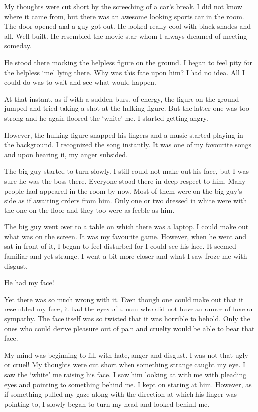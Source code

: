 \documentclass[twoside,11pt,titlepage]{article}
\begin{document}
My thoughts were cut short by the screeching of a car's break. I did not know where it came from, but there was an awesome looking sports car in the room. The door opened and a guy got out. He looked really cool with black shades and all. Well built. He resembled the movie star whom I always dreamed of meeting someday.

He stood there mocking the helpless figure on the ground. I began to feel pity for the helpless `me' lying there. Why was this fate upon him? I had no idea. All I could do was to wait and see what would happen.

At that instant, as if with a sudden burst of energy, the figure on the ground jumped and tried taking a shot at the hulking figure. But the latter one was too strong and he again floored the `white' me. I started getting angry.

However, the hulking figure snapped his fingers and a music started playing in the background. I recognized the song instantly. It was one of my favourite songs and upon hearing it, my anger subsided.

The big guy started to turn slowly. I still could not make out his face, but I was sure he was the boss there. Everyone stood there in deep respect to him. Many people had appeared in the room by now. Most of them were on the big guy's side as if awaiting orders from him. Only one or two dressed in white were with the one on the floor and they too were as feeble as him.

The big guy went over to a table on which there was a laptop. I could make out what was on the screen. It was my favourite game. However, when he went and sat in front of it, I began to feel disturbed for I could see his face. It seemed familiar and yet strange. I went a bit more closer and what I saw froze me with disgust.

He had my face!

Yet there was so much wrong with it. Even though one could make out that it resembled my face, it had the eyes of a man who did not have an ounce of love or sympathy. The face itself was so twisted that it was horrible to behold. Only the ones who could derive pleasure out of pain and cruelty would be able to bear that face.

My mind was beginning to fill with hate, anger and disgust. I was not that ugly or cruel! My thoughts were cut short when something strange caught my eye. I saw the `white' me raising his face. I saw him looking at with me with pleading eyes and pointing to something behind me. I kept on staring at him. However, as if something pulled my gaze along with the direction at which his finger was pointing to, I slowly began to turn my head and looked behind me.
\end{document}
